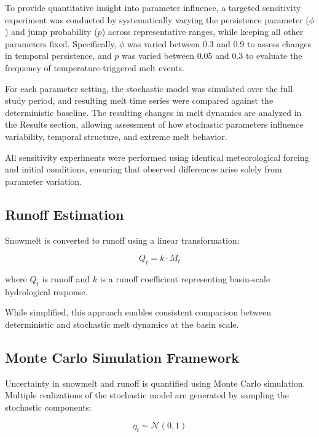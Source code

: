 \documentclass[11pt]{article}
\begin{document}
	To provide quantitative insight into parameter influence, a targeted sensitivity experiment was conducted by systematically varying the persistence parameter ($\phi$) and jump probability ($p$) across representative ranges, while keeping all other parameters fixed. Specifically, $\phi$ was varied between 0.3 and 0.9 to assess changes in temporal persistence, and $p$ was varied between 0.05 and 0.3 to evaluate the frequency of temperature-triggered melt events. 
	
	For each parameter setting, the stochastic model was simulated over the full study period, and resulting melt time series were compared against the deterministic baseline. The resulting changes in melt dynamics are analyzed in the Results section, allowing assessment of how stochastic parameters influence variability, temporal structure, and extreme melt behavior. 
	
	All sensitivity experiments were performed using identical meteorological forcing and initial conditions, ensuring that observed differences arise solely from parameter variation.
	
	
	\subsection{Runoff Estimation}
	
	Snowmelt is converted to runoff using a linear transformation:
	
	\begin{equation}
		Q_t = k \cdot M_t
	\end{equation}
	
	where $Q_t$ is runoff and $k$ is a runoff coefficient representing basin-scale hydrological response.
	
	While simplified, this approach enables consistent comparison between deterministic and stochastic melt dynamics at the basin scale.
	
	\subsection{Monte Carlo Simulation Framework}
	
	Uncertainty in snowmelt and runoff is quantified using Monte Carlo simulation. Multiple realizations of the stochastic model are generated by sampling the stochastic components:
	
	\begin{equation}
		\eta_t \sim \mathcal{N}(0,1)
	\end{equation}
	
\end{document}
